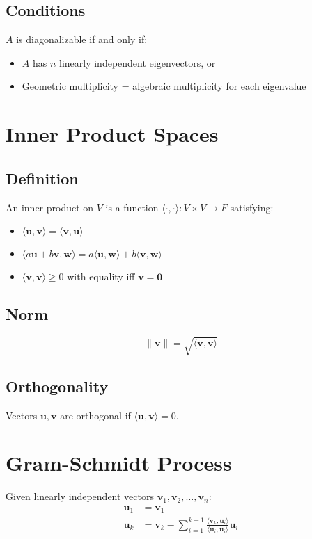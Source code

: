 \documentclass[11pt]{article}
\begin{document}
\subsection{Conditions}
$A$ is diagonalizable if and only if:
\begin{itemize}
    \item $A$ has $n$ linearly independent eigenvectors, or
    \item Geometric multiplicity = algebraic multiplicity for each eigenvalue
\end{itemize}

\section{Inner Product Spaces}

\subsection{Definition}
An inner product on $V$ is a function $\langle \cdot, \cdot \rangle : V \times V \to F$ satisfying:
\begin{itemize}
    \item $\langle \mathbf{u}, \mathbf{v} \rangle = \overline{\langle \mathbf{v}, \mathbf{u} \rangle}$
    \item $\langle a\mathbf{u} + b\mathbf{v}, \mathbf{w} \rangle = a\langle \mathbf{u}, \mathbf{w} \rangle + b\langle \mathbf{v}, \mathbf{w} \rangle$
    \item $\langle \mathbf{v}, \mathbf{v} \rangle \geq 0$ with equality iff $\mathbf{v} = \mathbf{0}$
\end{itemize}

\subsection{Norm}
$$\|\mathbf{v}\| = \sqrt{\langle \mathbf{v}, \mathbf{v} \rangle}$$

\subsection{Orthogonality}
Vectors $\mathbf{u}, \mathbf{v}$ are orthogonal if $\langle \mathbf{u}, \mathbf{v} \rangle = 0$.

\section{Gram-Schmidt Process}

Given linearly independent vectors $\mathbf{v}_1, \mathbf{v}_2, \ldots, \mathbf{v}_n$:
\begin{align}
\mathbf{u}_1 &= \mathbf{v}_1 \\
\mathbf{u}_k &= \mathbf{v}_k - \sum_{i=1}^{k-1} \frac{\langle \mathbf{v}_k, \mathbf{u}_i \rangle}{\langle \mathbf{u}_i, \mathbf{u}_i \rangle}\mathbf{u}_i
\end{align}
\end{document}
